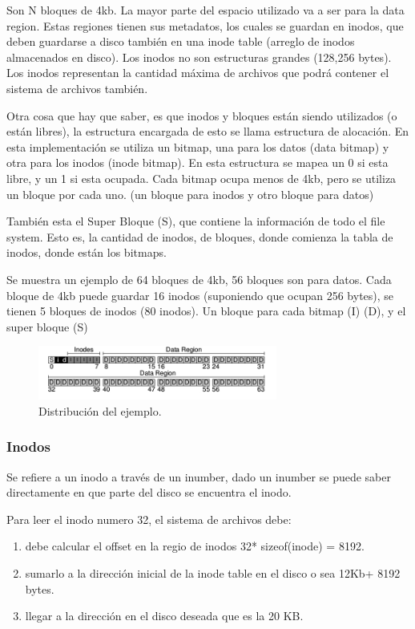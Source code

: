 \documentclass[titlepage,a4paper]{article}
\begin{document}
Son N bloques de 4kb. La mayor parte del espacio utilizado va a ser para la data region. Estas regiones tienen sus metadatos, los cuales se guardan en inodos, que deben guardarse a disco también en una inode table (arreglo de inodos almacenados en disco). Los inodos no son estructuras grandes (128,256 bytes). Los inodos representan la cantidad máxima de archivos que podrá contener el sistema de archivos también.

Otra cosa que hay que saber, es que inodos y bloques están siendo utilizados (o están libres), la estructura encargada de esto se llama estructura de alocación. En esta implementación se utiliza un bitmap, una para los datos (data bitmap) y otra para los inodos (inode bitmap). En esta estructura se mapea un 0 si esta libre, y un 1 si esta ocupada. Cada bitmap ocupa menos de 4kb, pero se utiliza un bloque por cada uno. (un bloque para inodos y otro bloque para datos)

También esta el Super Bloque (S), que contiene la información de todo el file system. Esto es, la cantidad de inodos, de bloques, donde comienza la tabla de inodos, donde están los bitmaps.

Se muestra un ejemplo de 64 bloques de 4kb, 56 bloques son para datos. Cada bloque de 4kb puede guardar 16 inodos (suponiendo que ocupan 256 bytes), se tienen 5 bloques de inodos (80 inodos). Un bloque para cada bitmap (I) (D), y el super bloque (S)

    \begin{figure}[!htb]
    \centering
    \includegraphics[width=0.7\textwidth]{ImagenesApunte/distribucionDisco.jpg}
    \caption{Distribución del ejemplo.}
    \end{figure}

\subsubsection*{Inodos}
Se refiere a un inodo a través de un inumber, dado un inumber se puede saber directamente en que parte del disco se encuentra el inodo.

Para leer el inodo numero 32, el sistema de archivos debe: 
\begin{enumerate}
    \item debe calcular el offset en la regio de inodos 32* sizeof(inode) = 8192.
    \item sumarlo a la dirección inicial de la inode table en el disco o sea 12Kb+ 8192 bytes.
    \item llegar a la dirección en el disco deseada que es la 20 KB.
\end{enumerate}
\end{document}
